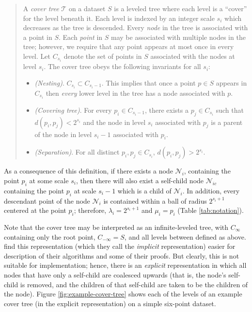 \begin{quote}
A {\it cover tree} $\mathscr{T}$ on a dataset $S$ is a leveled tree where each
level is a ``cover'' for the level beneath it.  Each level is indexed by an
integer scale $s_i$ which decreases as the tree is descended.  Every {\it node}
in the tree is associated with a point in $S$.  Each {\it point} in $S$ may be
associated with multiple nodes in the tree; however, we require that any point
appears at most once in every level.  Let $C_{s_i}$ denote the set of points in
$S$ associated with the nodes at level $s_i$.  The cover tree obeys the
following invariants for all $s_i$:

\begin{itemize}
  \item {\em (Nesting)}. $C_{s_i} \subset C_{s_i - 1}$.  This implies that once a
point $p \in S$ appears in $C_{s_i}$ then {\it every} lower level in the tree
has a node associated with $p$.

  \item {\em (Covering tree)}. For every $p_i \in C_{s_i - 1}$, there exists a
$p_j \in C_{s_i}$ such that $d(p_i, p_j) < 2^{s_i}$ and the node in level $s_i$
associated with $p_j$ is a parent of the node in level $s_i - 1$ associated with
$p_i$.

  \item {\em (Separation)}.  For all distinct $p_i, p_j \in C_{s_i}$, $d(p_i,
p_j) > 2^{s_i}$.
\end{itemize}
\end{quote}

As a consequence of this definition, if there exists a node $\mathscr{N}_i$,
containing the point $p_i$ at some scale $s_i$, then there will also exist a
self-child node $\mathscr{N}_{ic}$ containing the point $p_i$ at scale $s_i - 1$
which is a child of $\mathscr{N}_i$.  In addition, every descendant point of the
node $\mathscr{N}_i$ is contained within a ball of radius $2^{s_i + 1}$ centered
at the point $p_i$; therefore, $\lambda_i = 2^{s_i + 1}$ and $\mu_i = p_i$
(Table \ref{tab:notation}).

Note that the cover tree may be interpreted as an infinite-leveled tree, with
$C_{\infty}$ containing only the root point, $C_{-\infty} = S$, and all levels
between defined as above.  \citet{langford2006} find
this representation (which they call the {\it implicit} representation) easier
for description of their algorithms and some of their proofs.  But clearly,
this is not suitable for implementation; hence, there is an {\it explicit}
representation in which all nodes that have only a self-child are coalesced
upwards (that is, the node's self-child is removed, and the children of that
self-child are taken to be the children of the node).  Figure
\ref{fig:example-cover-tree} shows each of the levels of an example cover tree
(in the explicit representation) on a simple six-point dataset.


